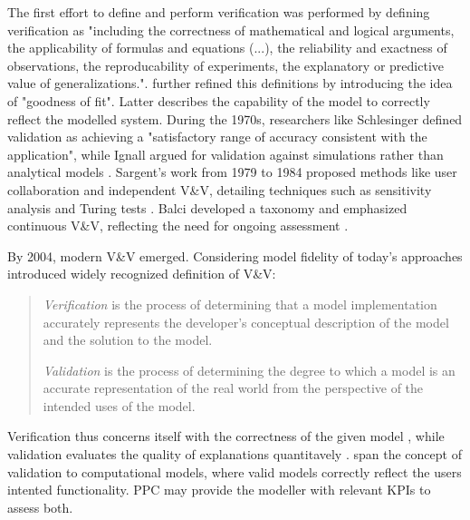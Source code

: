 The first effort to define and perform verification was performed by \autocite{machlup1955problem} defining verification as "including the correctness of mathematical and logical arguments, the applicability of formulas and equations (...), the reliability and exactness of observations, the reproducability of experiments, the explanatory or predictive value of generalizations.". \Autocite{naylor1967verification} further refined this definitions by introducing the idea of "goodness of fit". Latter describes the capability of the model to correctly reflect the modelled system. During the 1970s, researchers like Schlesinger \autocite{schlesinger1979terminology} defined validation as achieving a "satisfactory range of accuracy consistent with the application", while Ignall argued for validation against simulations rather than analytical models \autocite{ignall1978using}. Sargent's work from 1979 to 1984 proposed methods like user collaboration and independent V&V, detailing techniques such as sensitivity analysis and Turing tests \autocite{Sargent2010wsc}. Balci developed a taxonomy and emphasized continuous V&V, reflecting the need for ongoing assessment \autocite{balci2012life}.

By 2004, modern V&V emerged. Considering model fidelity of today's approaches \autocite{Oberkampf2004amr} introduced widely recognized definition of V&V:

\begin{quote}
  \textit{Verification} is the process of determining that a model implementation accurately represents the developer's conceptual description of the model and the solution to the model.

  \textit{Validation} is the process of determining the degree to which a model is an accurate representation of the real world from the perspective of the intended uses of the model. \autocite{Oberkampf2004amr}
\end{quote}

Verification thus concerns itself with the correctness of the given model \autocite{Sargent2010wsc}, while validation evaluates the quality of explanations quantitavely \autocite{Oberkampf2004amr}.  span the concept of validation to computational models, where valid models correctly reflect the users intented functionality. PPC may provide the modeller with relevant KPIs to assess both. 

